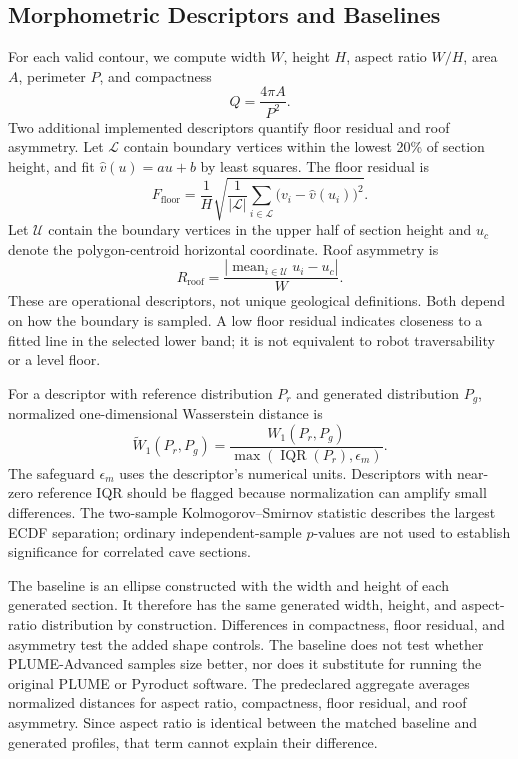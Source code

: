 \documentclass[conference]{IEEEtran}
\begin{document}
\subsection{Morphometric Descriptors and Baselines}
For each valid contour, we compute width $W$, height $H$, aspect ratio $W/H$, area $A$, perimeter $P$, and compactness
\begin{equation}
Q=\frac{4\pi A}{P^2}.
\label{eq:compactness}
\end{equation}
Two additional implemented descriptors quantify floor residual and roof asymmetry. Let $\mathcal{L}$ contain boundary vertices within the lowest 20\% of section height, and fit $\widehat{v}(u)=au+b$ by least squares. The floor residual is
\begin{equation}
F_{\mathrm{floor}}=\frac{1}{H}
\sqrt{\frac{1}{|\mathcal{L}|}\sum_{i\in\mathcal{L}}
\bigl(v_i-\widehat{v}(u_i)\bigr)^2}.
\label{eq:floor-metric}
\end{equation}
Let $\mathcal{U}$ contain the boundary vertices in the upper half of section height and $u_c$ denote the polygon-centroid horizontal coordinate. Roof asymmetry is
\begin{equation}
R_{\mathrm{roof}}=\frac{|\operatorname{mean}_{i\in\mathcal{U}}u_i-u_c|}{W}.
\label{eq:roof-metric}
\end{equation}
These are operational descriptors, not unique geological definitions. Both depend on how the boundary is sampled. A low floor residual indicates closeness to a fitted line in the selected lower band; it is not equivalent to robot traversability or a level floor.

For a descriptor with reference distribution $P_r$ and generated distribution $P_g$, normalized one-dimensional Wasserstein distance is
\begin{equation}
\widetilde{W}_1(P_r,P_g)=
\frac{W_1(P_r,P_g)}{\max(\operatorname{IQR}(P_r),\epsilon_m)}.
\label{eq:normalized-w1}
\end{equation}
The safeguard $\epsilon_m$ uses the descriptor's numerical units. Descriptors with near-zero reference IQR should be flagged because normalization can amplify small differences. The two-sample Kolmogorov--Smirnov statistic describes the largest ECDF separation; ordinary independent-sample $p$-values are not used to establish significance for correlated cave sections.

The baseline is an ellipse constructed with the width and height of each generated section. It therefore has the same generated width, height, and aspect-ratio distribution by construction. Differences in compactness, floor residual, and asymmetry test the added shape controls. The baseline does not test whether PLUME-Advanced samples size better, nor does it substitute for running the original PLUME or Pyroduct software. The predeclared aggregate averages normalized distances for aspect ratio, compactness, floor residual, and roof asymmetry. Since aspect ratio is identical between the matched baseline and generated profiles, that term cannot explain their difference.
\end{document}
